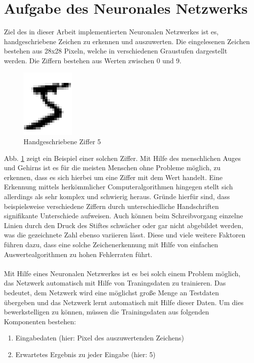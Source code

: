 \section{Aufgabe des Neuronales Netzwerks}
Ziel des in dieser Arbeit implementierten Neuronalen Netzwerkes ist es, handgeschriebene Zeichen zu erkennen und auszuwerten. Die eingelesenen Zeichen bestehen aus 28x28 Pixeln, welche in verschiedenen Graustufen dargestellt werden. Die Ziffern bestehen aus Werten zwischen 0 und 9. 
\begin{figure}[hbt]
	\centering
	\includegraphics[scale=0.6]{Bilder/handdrawn_digit}
	\caption{Handgeschriebene Ziffer 5 \cite{nielson:2017}} 
	\label{fig:handwritten_digit_5} 
\end{figure}
Abb. \ref{fig:handwritten_digit_5} zeigt ein Beispiel einer solchen Ziffer. Mit Hilfe des menschlichen Auges und Gehirns ist es für die meisten Menschen ohne Probleme möglich, zu erkennen, dass es sich hierbei um eine Ziffer mit dem Wert \grqq handelt. Eine Erkennung mittels herkömmlicher Computeralgorithmen hingegen stellt sich allerdings als sehr komplex und schwierig heraus. Gründe hierfür sind, dass beispielsweise verschiedene Ziffern durch unterschiedliche Handschriften signifikante Unterschiede aufweisen. Auch können beim Schreibvorgang einzelne Linien durch den Druck des Stiftes schwächer oder gar nicht abgebildet werden, was die gezeichnete Zahl ebenso variieren lässt. Diese und viele weitere Faktoren führen dazu, dass eine solche Zeichenerkennung mit Hilfe von einfachen Auswertealgorithmen zu hohen Fehlerraten führt. \\ \\
Mit Hilfe eines Neuronalen Netzwerkes ist es bei solch einem Problem möglich, das Netzwerk automatisch mit Hilfe von Traningsdaten zu trainieren. Das bedeutet, dem Netzwerk wird eine möglichst große Menge an Testdaten übergeben und das Netzwerk lernt automatisch mit Hilfe dieser Daten. Um dies bewerkstelligen zu können, müssen die Trainingsdaten aus folgenden Komponenten bestehen:
\begin{enumerate}
\item Eingabedaten (hier: Pixel des auszuwertenden Zeichens)
\item Erwartetes Ergebnis zu jeder Eingabe (hier: 5)
\end{enumerate}

